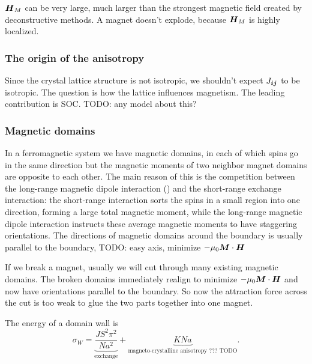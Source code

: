\documentclass[hyperref, a4paper]{article}
\begin{document}
$\vb*{H}_{M}$ can be very large,
much larger than the strongest magnetic field created 
by deconstructive methods.
A magnet doesn't explode, 
because $\vb*{H}_M$ is highly localized.

\subsubsection{The origin of the anisotropy}

Since the crystal lattice structure is not isotropic, 
we shouldn't expect $J_{\vb*{i} \vb*{j}}$ to be isotropic.
The question is how the lattice influences magnetism.
The leading contribution is SOC. TODO: any model about this?

\subsubsection{Magnetic domains}

In a ferromagnetic system 
we have magnetic domains, 
in each of which spins go in the same direction 
but the magnetic moments of two neighbor magnet domains
are opposite to each other.
The main reason of this is the competition between 
the long-range magnetic dipole interaction ()
and the short-range exchange interaction:
the short-range interaction sorts the spins in a small region into one direction,
forming a large total magnetic moment,
while the long-range magnetic dipole interaction 
instructs these average magnetic moments to have staggering orientations.
The directions of magnetic domains around the boundary is usually parallel to the boundary,
TODO: easy axis, minimize $- \mu_0 \vb*{M} \cdot \vb*{H}$

If we break a magnet,
usually we will cut through many existing magnetic domains.
The broken domains immediately 
realign to minimize $- \mu_0 \vb*{M} \cdot \vb*{H}$
and now have orientations parallel to the boundary.
So now the attraction force across the cut 
is too weak to glue the two parts together into one magnet.

The energy of a domain wall is 
\begin{equation}
    \sigma_W = \underbrace{\frac{J S^2 \pi^2}{N a^2}}_{\text{exchange}} 
    + \underbrace{KNa}_\text{magneto-crystalline anisotropy ??? TODO}.
\end{equation}
\end{document}
